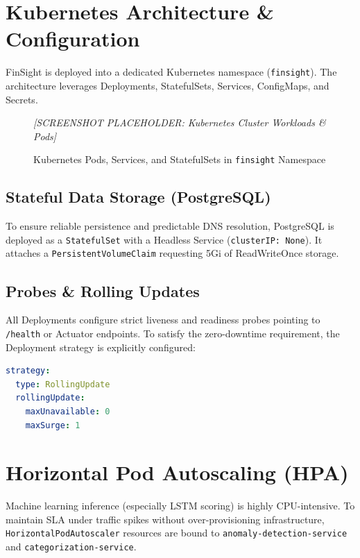 \documentclass[12pt,a4paper]{report}
\begin{document}
\section{Kubernetes Architecture \& Configuration}

FinSight is deployed into a dedicated Kubernetes namespace (\texttt{finsight}). The architecture leverages Deployments, StatefulSets, Services, ConfigMaps, and Secrets.

\begin{figure}[H]
  \centering
  \begin{tcolorbox}[enhanced, colback=gray!10, colframe=gray!50, width=0.9\linewidth,
      height=6cm, arc=6pt, valign=center, halign=center]
    \textcolor{gray!70}{\large\textit{[SCREENSHOT PLACEHOLDER: Kubernetes Cluster Workloads \& Pods]}}
  \end{tcolorbox}
  \caption{Kubernetes Pods, Services, and StatefulSets in \texttt{finsight} Namespace}
\end{figure}

\subsection{Stateful Data Storage (PostgreSQL)}
To ensure reliable persistence and predictable DNS resolution, PostgreSQL is deployed as a \texttt{StatefulSet} with a Headless Service (\texttt{clusterIP: None}). It attaches a \texttt{PersistentVolumeClaim} requesting 5Gi of ReadWriteOnce storage.

\subsection{Probes \& Rolling Updates}
All Deployments configure strict liveness and readiness probes pointing to \texttt{/health} or Actuator endpoints. To satisfy the zero-downtime requirement, the Deployment strategy is explicitly configured:
\begin{lstlisting}[language=YAML, caption=Kubernetes RollingUpdate Strategy]
strategy:
  type: RollingUpdate
  rollingUpdate:
    maxUnavailable: 0
    maxSurge: 1
\end{lstlisting}

\section{Horizontal Pod Autoscaling (HPA)}

Machine learning inference (especially LSTM scoring) is highly CPU-intensive. To maintain SLA under traffic spikes without over-provisioning infrastructure, \texttt{HorizontalPodAutoscaler} resources are bound to \texttt{anomaly-detection-service} and \texttt{categorization-service}.
\end{document}
